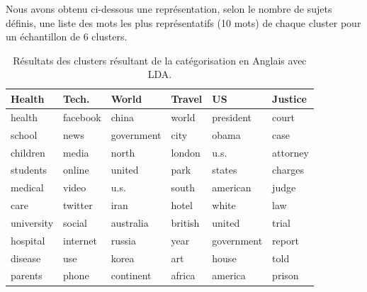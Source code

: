     Nous avons obtenu ci-dessous une représentation, selon le nombre de sujets définis, une liste des mots les plus représentatifs (10 mots) de chaque cluster pour un échantillon de 6 clusters.
    \begin{table}[H]
        \begin{center}
            \begin{tabular}{|C{2.1cm}|C{2.1cm}|C{2.1cm}|C{2.1cm}|C{2.1cm}|C{2.1cm}|}
                \hline                      
                \textbf{Health} & \textbf{Tech.} & \textbf{World} & \textbf{Travel} & \textbf{US} & \textbf{Justice}\\ 
                \hline     
                health &  facebook &         china  &    world  &     president   &   court \\
                school  &     news  &   government  &     city     &      obama  &     case \\
                children  &    media   &       north  &   london     &       u.s.  & attorney \\  
                students  &   online   &      united  &     park     &     states  &  charges \\  
                medical  &    video   &        u.s.  &    south     &   american  &    judge \\  
                care  &  twitter   &        iran  &    hotel     &      white  &      law \\  
                university  &   social   &      australia  &  british     &     united  & trial \\ 
                hospital &  internet   &      russia   &    year   &   government  &   report \\  
                disease   &     use   &       korea   &     art & house  &    told  \\  
                parents   &   phone & continent &   africa    &     america  &   prison \\  
                \hline
                
            \end{tabular}
        \end{center}
        \caption{Résultats des clusters résultant de la catégorisation en Anglais avec LDA.}
        \label{Lda-categ}
    \end{table}                           

